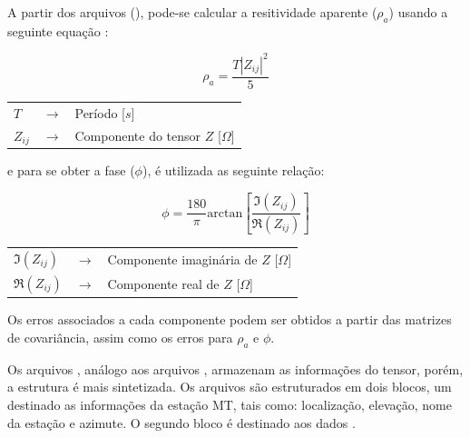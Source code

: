         A partir dos arquivos  (), pode-se calcular a resitividade aparente ($\rho_a$) usando a seguinte equação \cite{z-files}:
        
        \begin{equation}
         \rho_a = \dfrac{T|Z_{ij}|^2}{5}
        \end{equation}

        {\footnotesize \noindent
            \begin{table}[H]
                \begin{tabular*}{1cm}{p{0.05cm}p{0.1cm}p{10cm}}
                    {\footnotesize $T$}          & {\footnotesize $\rightarrow$} & {\footnotesize Período [$s$] }\\
                    {\footnotesize $Z_{ij}$}  & {\footnotesize $\rightarrow$} & {\footnotesize Componente do tensor $Z$ [$\Omega$] }\\
                \end{tabular*}
            \end{table}}
        
        \noindent e para se obter a fase ($\phi$), é utilizada as seguinte relação:
        
        \begin{equation}
         \phi = \dfrac{180}{\pi} \textrm{arctan}\left [\dfrac{\Im(Z_{ij})}{\Re(Z_{ij})} \right ]
        \end{equation}

        {\footnotesize \noindent
            \begin{table}[H]
                \begin{tabular*}{5cm}{p{.9cm}p{0.1cm}p{10cm}}
                    {\footnotesize $\Im(Z_{ij})$}  & {\footnotesize $\rightarrow$} & {\footnotesize Componente imaginária de $Z$ [$\Omega$]}\\
                    {\footnotesize $\Re(Z_{ij})$}  & {\footnotesize $\rightarrow$} & {\footnotesize Componente real de  $Z$ [$\Omega$]}\\
                \end{tabular*}
            \end{table}}
        
        Os erros associados a cada componente podem ser obtidos a partir das matrizes de covariância, assim como os erros para $\rho_a$ e $\phi$.
        
        Os arquivos , análogo aos arquivos , armazenam as informações do tensor, porém, a estrutura é mais sintetizada. Os arquivos são estruturados em dois blocos, um destinado as informações da estação MT, tais como: localização, elevação, nome da estação e azimute. O segundo bloco é destinado aos dados \cite{j-format}.
        
